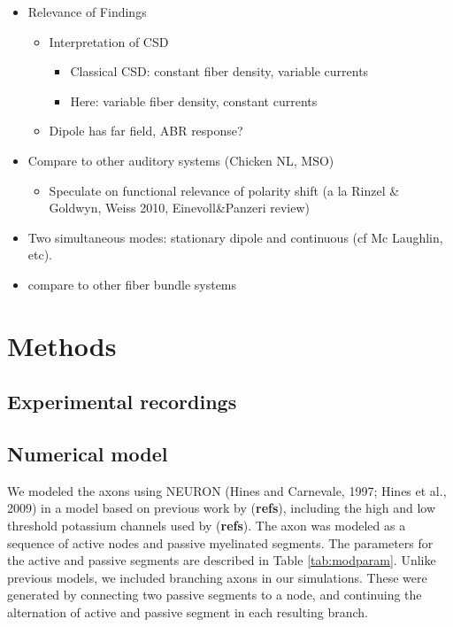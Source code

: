 \documentclass[]{article}
\providecommand{\tightlist}{%
  \setlength{\itemsep}{0pt}\setlength{\parskip}{0pt}}
\begin{document}
\begin{itemize}
\tightlist
\item
  Relevance of Findings

  \begin{itemize}
  \tightlist
  \item
    Interpretation of CSD

    \begin{itemize}
    \tightlist
    \item
      Classical CSD: constant fiber density, variable currents
    \item
      Here: variable fiber density, constant currents
    \end{itemize}
  \item
    Dipole has far field, ABR response?
  \end{itemize}
\item
  Compare to other auditory systems (Chicken NL, MSO)

  \begin{itemize}
  \tightlist
  \item
    Speculate on functional relevance of polarity shift (a la Rinzel \&
    Goldwyn, Weiss 2010, Einevoll\&Panzeri review)
  \end{itemize}
\item
  Two simultaneous modes: stationary dipole and continuous (cf Mc
  Laughlin, etc).
\item
  compare to other fiber bundle systems
\end{itemize}

\section{Methods}\label{methods}

\subsection{Experimental recordings}\label{experimental-recordings}

\subsection{Numerical model}\label{numerical-model}

We modeled the axons using NEURON (Hines and Carnevale, 1997; Hines et
al., 2009) in a model based on previous work by (\textbf{refs}),
including the high and low threshold potassium channels used by
(\textbf{refs}). The axon was modeled as a sequence of active nodes and
passive myelinated segments. The parameters for the active and passive
segments are described in Table \ref{tab:modparam}. Unlike previous
models, we included branching axons in our simulations. These were
generated by connecting two passive segments to a node, and continuing
the alternation of active and passive segment in each resulting branch.
\end{document}
